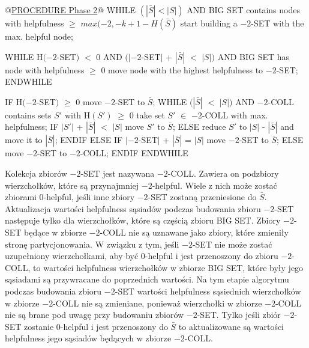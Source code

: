 \begin{pseudocode}
@\underline{PROCEDURE Phase 2}@
  WHILE $(|\bar{S}| < |S|)$ AND BIG SET contains nodes with helpfulness $\geq$ $max(-2, -k + 1 - H(\bar{S})$
    start building a $-2$-SET with the max. helpful node;

    WHILE H$(-2$-SET$)$ $<$ $0$ AND $(|-2$-SET$|$ + $|\bar{S}|$ $<$ $|S|)$ AND
          BIG SET has node with helpfulness $\geq$ $0$
      move node with the highest helpfulness to $-2$-SET;
    ENDWHILE

    IF H$(-2$-SET$)$ $\geq$ 0
      move $-2$-SET to $\bar{S}$;
      WHILE $(|\bar{S}|$ $<$ $|S|)$ AND $-2$-COLL contains sets $S'$ with H$(S')$ $\geq$ $0$
        take set $S'$ $\in$ $-2$-COLL with max. helpfulness;
        IF $|S'|$ + $|\bar{S}|$ $<$ $|S|$
          move $S'$ to $\bar{S}$;
        ELSE
          reduce $S'$ to $|S|$ - $|\bar{S}|$ and move it to $|\bar{S}|$;
        ENDIF
    ELSE IF $| -2$-SET$|$ + $|\bar{S}|$ = $|S|$
      move $-2$-SET to $\bar{S}$;
    ELSE
      move $-2$-SET to $-2$-COLL;
    ENDIF
  ENDWHILE
\end{pseudocode}
\vspace{-8mm}
\label{code:phase_2}
\vspace{4mm}
Kolekcja zbiorów $-2$-SET jest nazywana $-2$-COLL.
Zawiera on podzbiory wierzchołków, które są przynajmniej $-2$-helpful.
Wiele z nich może zostać zbiorami $0$-helpful, jeśli inne zbiory $-2$-SET zostaną przeniesione do $\bar{S}$.
Aktualizacja wartości helpfulness sąsiadów podczas budowania zbioru $-2$-SET następuje tylko dla wierzchołków,
które są częścią zbioru BIG SET.
Zbiory $-2$-SET będące w zbiorze $-2$-COLL nie są uznawane jako zbiory, które zmieniły stronę partycjonowania.
W związku z tym, jeśli $-2$-SET nie może zostać uzupełniony wierzchołkami, aby być $0$-helpful i jest przenoszony
do zbioru $-2$-COLL, to wartości helpfulness wierzchołków w zbiorze BIG SET, które były jego sąsiadami są przywracane
do poprzednich wartości.
Na tym etapie algorytmu podczas budowania zbioru $-2$-SET wartości helpfulness sąsiednich wierzchołków w zbiorze
$-2$-COLL nie są zmieniane, ponieważ wierzchołki w zbiorze $-2$-COLL nie są brane pod uwagę przy budowaniu zbiorów
$-2$-SET.
Tylko jeśli zbiór $-2$-SET zostanie $0$-helpful i jest przenoszony do $\bar{S}$ to aktualizowane są wartości helpfulness
jego sąsiadów będących w zbiorze $-2$-COLL.

